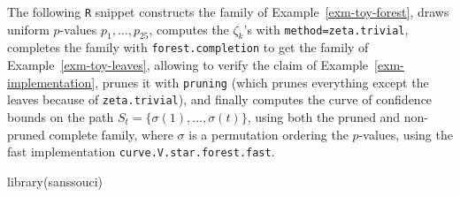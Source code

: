 \documentclass[
  11pt,
  a4paper,
]{article}
\newenvironment{Shaded}{}{}
\newcommand{\FunctionTok}[1]{\textcolor[rgb]{0.44,0.26,0.76}{#1}}
\newcommand{\NormalTok}[1]{\textcolor[rgb]{0.14,0.16,0.18}{#1}}
\theoremstyle{plain}
\theoremstyle{plain}
\theoremstyle{definition}
\theoremstyle{plain}
\theoremstyle{definition}
\theoremstyle{remark}
\begin{document}
The following \texttt{R} snippet constructs the family of
Example~\ref{exm-toy-forest}, draws uniform \(p\)-values
\(p_1,\dotsc,p_{25}\), computes the \(\zeta_k\)'s with
\texttt{method=zeta.trivial}, completes the family with
\texttt{forest.completion} to get the family of
Example~\ref{exm-toy-leaves}, allowing to verify the claim of
Example~\ref{exm-implementation}, prunes it with \texttt{pruning} (which
prunes everything except the leaves because of \texttt{zeta.trivial}),
and finally computes the curve of confidence bounds on the path
\(S_t=\{\sigma(1),\dots,\sigma(t)\}\), using both the pruned and
non-pruned complete family, where \(\sigma\) is a permutation ordering
the \(p\)-values, using the fast implementation
\texttt{curve.V.star.forest.fast}.

\begin{Shaded}
\begin{Highlighting}[]
\FunctionTok{library}\NormalTok{(sanssouci)}


\end{Highlighting}
\end{Shaded}
\end{document}
